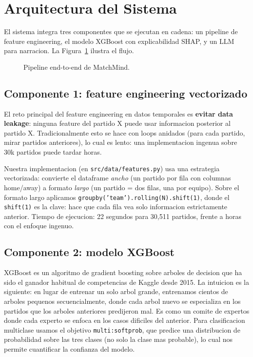 \documentclass[10pt,twocolumn]{article}
\begin{document}
\section{Arquitectura del Sistema}
\label{sec:arq}

El sistema integra tres componentes que se ejecutan en cadena: un pipeline de feature engineering, el modelo XGBoost con explicabilidad SHAP, y un LLM para narracion. La Figura~\ref{fig:pipeline} ilustra el flujo.

\begin{figure}[H]
  \centering
  \caption{Pipeline end-to-end de MatchMind.}
  \label{fig:pipeline}
\end{figure}

\subsection{Componente 1: feature engineering vectorizado}

El reto principal del feature engineering en datos temporales es \textbf{evitar data leakage}: ninguna feature del partido X puede usar informacion posterior al partido X. Tradicionalmente esto se hace con loops anidados (para cada partido, mirar partidos anteriores), lo cual es lento: una implementacion ingenua sobre 30k partidos puede tardar horas.

Nuestra implementacion (en \texttt{src/data/features.py}) usa una estrategia vectorizada: convierte el dataframe \textit{ancho} (un partido por fila con columnas home/away) a formato \textit{largo} (un partido = dos filas, una por equipo). Sobre el formato largo aplicamos \texttt{groupby('team').rolling(N).shift(1)}, donde el \texttt{shift(1)} es la clave: hace que cada fila vea solo informacion estrictamente anterior. Tiempo de ejecucion: 22 segundos para 30,511 partidos, frente a horas con el enfoque ingenuo.

\subsection{Componente 2: modelo XGBoost}

XGBoost \cite{chen2016} es un algoritmo de gradient boosting sobre arboles de decision que ha sido el ganador habitual de competencias de Kaggle desde 2015. La intuicion es la siguiente: en lugar de entrenar un solo arbol grande, entrenamos cientos de arboles pequenos secuencialmente, donde cada arbol nuevo se especializa en los partidos que los arboles anteriores predijeron mal. Es como un comite de expertos donde cada experto se enfoca en los casos dificiles del anterior. Para clasificacion multiclase usamos el objetivo \texttt{multi:softprob}, que predice una distribucion de probabilidad sobre las tres clases (no solo la clase mas probable), lo cual nos permite cuantificar la confianza del modelo.
\end{document}
